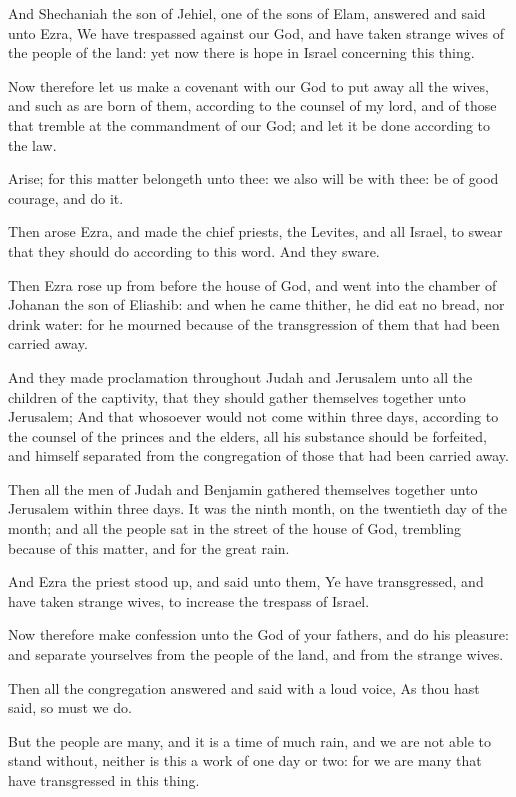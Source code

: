 \Verse And Shechaniah the son of Jehiel, one of the sons of Elam, answered and said unto Ezra, We have trespassed against our God, and have taken strange wives of the people of the land: yet now there is hope in Israel concerning this thing.

\Verse Now therefore let us make a covenant with our God to put away all the wives, and such as are born of them, according to the counsel of my lord, and of those that tremble at the commandment of our God; and let it be done according to the law.

\Verse Arise; for this matter belongeth unto thee: we also will be with thee: be of good courage, and do it.

\Verse Then arose Ezra, and made the chief priests, the Levites, and all Israel, to swear that they should do according to this word. And they sware.

\Verse Then Ezra rose up from before the house of God, and went into the chamber of Johanan the son of Eliashib: and when he came thither, he did eat no bread, nor drink water: for he mourned because of the transgression of them that had been carried away.

\Verse And they made proclamation throughout Judah and Jerusalem unto all the children of the captivity, that they should gather themselves together unto Jerusalem; \Verse And that whosoever would not come within three days, according to the counsel of the princes and the elders, all his substance should be forfeited, and himself separated from the congregation of those that had been carried away.

\Verse Then all the men of Judah and Benjamin gathered themselves together unto Jerusalem within three days. It was the ninth month, on the twentieth day of the month; and all the people sat in the street of the house of God, trembling because of this matter, and for the great rain.

\Verse And Ezra the priest stood up, and said unto them, Ye have transgressed, and have taken strange wives, to increase the trespass of Israel.

\Verse Now therefore make confession unto the \LORD God of your fathers, and do his pleasure: and separate yourselves from the people of the land, and from the strange wives.

\Verse Then all the congregation answered and said with a loud voice, As thou hast said, so must we do.

\Verse But the people are many, and it is a time of much rain, and we are not able to stand without, neither is this a work of one day or two: for we are many that have transgressed in this thing.

